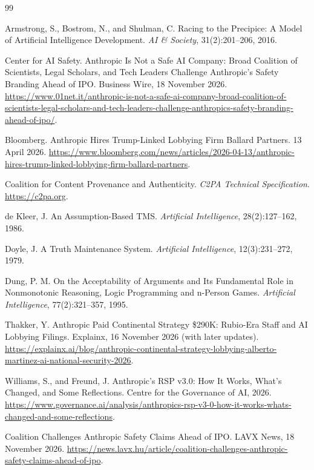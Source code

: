 \documentclass[12pt]{article}
\theoremstyle{definition}
\theoremstyle{remark}
\begin{document}
\begin{thebibliography}{99}

Armstrong, S., Bostrom, N., and Shulman, C. Racing to the Precipice: A Model of Artificial Intelligence Development. \textit{AI \& Society}, 31(2):201--206, 2016.

Center for AI Safety. Anthropic Is Not a Safe AI Company: Broad Coalition of Scientists, Legal Scholars, and Tech Leaders Challenge Anthropic's Safety Branding Ahead of IPO. Business Wire, 18 November 2026. \url{https://www.01net.it/anthropic-is-not-a-safe-ai-company-broad-coalition-of-scientists-legal-scholars-and-tech-leaders-challenge-anthropics-safety-branding-ahead-of-ipo/}.

Bloomberg. Anthropic Hires Trump-Linked Lobbying Firm Ballard Partners. 13 April 2026. \url{https://www.bloomberg.com/news/articles/2026-04-13/anthropic-hires-trump-linked-lobbying-firm-ballard-partners}.

Coalition for Content Provenance and Authenticity. \textit{C2PA Technical Specification}. \url{https://c2pa.org}.

de Kleer, J. An Assumption-Based TMS. \textit{Artificial Intelligence}, 28(2):127--162, 1986.

Doyle, J. A Truth Maintenance System. \textit{Artificial Intelligence}, 12(3):231--272, 1979.

Dung, P. M. On the Acceptability of Arguments and Its Fundamental Role in Nonmonotonic Reasoning, Logic Programming and n-Person Games. \textit{Artificial Intelligence}, 77(2):321--357, 1995.

Thakker, Y. Anthropic Paid Continental Strategy \$290K: Rubio-Era Staff and AI Lobbying Filings. Explainx, 16 November 2026 (with later updates). \url{https://explainx.ai/blog/anthropic-continental-strategy-lobbying-alberto-martinez-ai-national-security-2026}.

Williams, S., and Freund, J. Anthropic's RSP v3.0: How It Works, What's Changed, and Some Reflections. Centre for the Governance of AI, 2026. \url{https://www.governance.ai/analysis/anthropics-rsp-v3-0-how-it-works-whats-changed-and-some-reflections}.

Coalition Challenges Anthropic Safety Claims Ahead of IPO. LAVX News, 18 November 2026. \url{https://news.lavx.hu/article/coalition-challenges-anthropic-safety-claims-ahead-of-ipo}.


\end{thebibliography}
\end{document}
